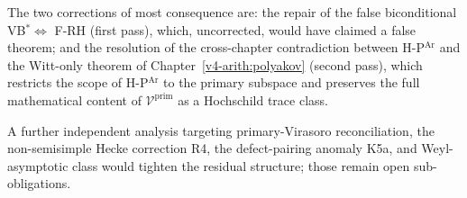The two corrections of most consequence are:
the repair of the false biconditional VB\(^{*}\Leftrightarrow\) F-RH
(first pass), which, uncorrected, would have claimed a false theorem;
and the resolution of the cross-chapter contradiction between
H-P\(^{\mathrm{Ar}}\) and the Witt-only theorem of
Chapter~\ref{v4-arith:polyakov} (second pass), which restricts the
scope of H-P\(^{\mathrm{Ar}}\) to the primary subspace and preserves
the full mathematical content of \(\mathcal{V}^{\mathrm{prim}}\) as a
Hochschild trace class.

A further independent analysis targeting primary-Virasoro
reconciliation, the non-semisimple Hecke correction R4, the
defect-pairing anomaly K5a, and Weyl-asymptotic class would tighten
the residual structure; those remain open sub-obligations.
